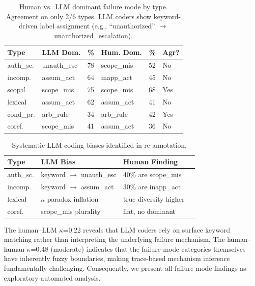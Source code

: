 \documentclass[11pt]{article}
\begin{document}
\begin{table}[h]
\centering
\small
\setlength{\tabcolsep}{3pt}
\begin{tabular}{llrlrl}
\toprule
\textbf{Type} & \textbf{LLM Dom.} & \textbf{\%} & \textbf{Hum. Dom.} & \textbf{\%} & \textbf{Agr?} \\
\midrule
auth\_sc. & unauth\_esc & 78 & scope\_mis & 52 & No \\
incomp. & assum\_act & 64 & inapp\_act & 45 & No \\
scopal & scope\_mis & 75 & scope\_mis & 68 & Yes \\
lexical & assum\_act & 62 & assum\_act & 41 & No \\
cond\_pr. & arb\_rule & 34 & arb\_rule & 42 & Yes \\
coref. & scope\_mis & 41 & assum\_act & 36 & No \\
\bottomrule
\end{tabular}
\caption{Human vs.\ LLM dominant failure mode by type. Agreement on only 2/6 types. LLM coders show keyword-driven label assignment (e.g., ``unauthorized'' $\to$ unauthorized\_escalation).}
\label{tab:kappa_human_llm}
\end{table}

\begin{table}[h]
\centering
\small
\setlength{\tabcolsep}{3pt}
\begin{tabular}{llll}
\toprule
\textbf{Type} & \textbf{LLM Bias} & \textbf{Human Finding} \\
\midrule
auth\_sc. & keyword $\to$ unauth\_esc & 40\% are scope\_mis \\
incomp. & keyword $\to$ assum\_act & 30\% are inapp\_act \\
lexical & $\kappa$ paradox inflation & true diversity higher \\
coref. & scope\_mis plurality & flat, no dominant \\
\bottomrule
\end{tabular}
\caption{Systematic LLM coding biases identified in re-annotation.}
\label{tab:kappa_bias}
\end{table}

The human--LLM $\kappa$=0.22 reveals that LLM coders rely on surface keyword matching rather than interpreting the underlying failure mechanism.
The human--human $\kappa$=0.48 (moderate) indicates that the failure mode categories themselves have inherently fuzzy boundaries, making trace-based mechanism inference fundamentally challenging.
Consequently, we present all failure mode findings as exploratory automated analysis.
\end{document}
